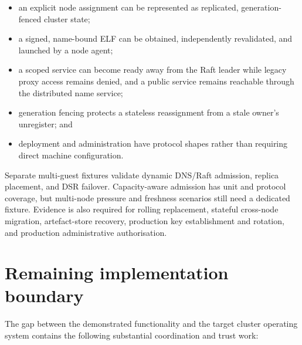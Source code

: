\begin{itemize}
    \item an explicit node assignment can be represented as replicated,
        generation-fenced cluster state;
    \item a signed, name-bound ELF can be obtained, independently revalidated,
        and launched by a node agent;
    \item a scoped service can become ready away from the Raft leader while
        legacy proxy access remains denied, and a public service remains
        reachable through the distributed name service;
    \item generation fencing protects a stateless reassignment from a stale
        owner's unregister; and
    \item deployment and administration have protocol shapes rather than
        requiring direct machine configuration.
\end{itemize}

Separate multi-guest fixtures validate dynamic DNS/Raft admission, replica
placement, and DSR failover. Capacity-aware admission has unit and protocol
coverage, but multi-node pressure and freshness scenarios still need a dedicated
fixture. Evidence is also required for rolling replacement, stateful cross-node
migration, artefact-store recovery, production key establishment and rotation,
and production administrative authorisation.

\section{Remaining implementation boundary}

The gap between the demonstrated functionality and the target cluster operating
system contains the following substantial coordination and trust work:


